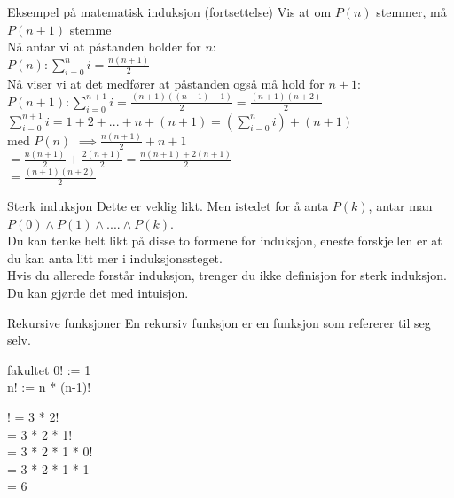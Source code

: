 \begin{frame}{Eksempel på matematisk induksjon (fortsettelse)}
    Vis at om $P(n)$ stemmer, må $P(n+1)$ stemme\\
    Nå antar vi at påstanden holder for $n$: \\
    $P(n): \sum_{i=0}^{n} i = \frac{n(n+1)}{2}$\\
    Nå viser vi at det medfører at påstanden også må hold for $n+1$:\\
    $P(n+1): \sum_{i=0}^{n+1} i = \frac{(n+1)((n+1)+1)}{2} = \frac{(n+1)(n+2)}{2}$\\

    $\sum_{i=0}^{n+1} i =1 + 2 + ... + n + (n+1) = (\sum_{i=0}^{n} i )+ (n+1)$\\
\pause
    med $P(n)$ $\implies \frac{n(n+1)}{2} + n + 1$\\
    $ = \frac{n(n+1)}{2}+\frac{2(n+1)}{2} = \frac{n(n+1)+2(n+1)}{2}$\\
    $ = \frac{(n+1)(n+2)}{2}$ \checkmark
\end{frame}

\begin{frame}{Sterk induksjon}
    Dette er veldig likt. Men istedet for å anta $P(k)$, antar man $P(0) \land P(1) \land .... \land P(k)$.\\
    Du kan tenke helt likt på disse to formene for induksjon, eneste forskjellen er at du kan anta litt mer i induksjonssteget.\\

    Hvis du allerede forstår induksjon, trenger du ikke definisjon for sterk induksjon. Du kan gjørde det med intuisjon.
\end{frame}

\begin{frame}{Rekursive funksjoner}
    En rekursiv funksjon er en funksjon som refererer til seg selv.
    \pause
    \begin{block}{fakultet}
        0! := 1 \\
        n! := n * (n-1)!\\
    \end{block}    
    ! = 3 * 2!\\
     = 3 * 2 * 1!\\
     = 3 * 2 * 1 * 0!\\
     = 3 * 2 * 1 * 1\\
     = 6
\end{frame}

